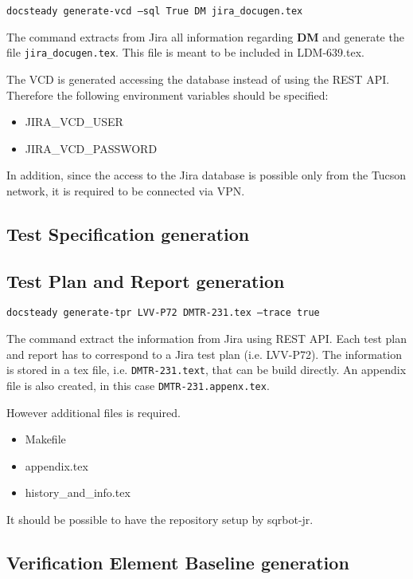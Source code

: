 \documentclass[DM]{lsstdoc}
\begin{document}
\texttt{docsteady generate-vcd --sql True DM jira\_docugen.tex}

The command extracts from Jira all information regarding \textbf{DM} and generate the file \texttt{jira\_docugen.tex}.
This file is meant to be included in LDM-639.tex.

The VCD is generated accessing the database instead of using the REST API. Therefore the following environment variables should be specified:

\begin{itemize}
\item JIRA\_VCD\_USER
\item JIRA\_VCD\_PASSWORD
\end{itemize}

In addition, since the access to the Jira database is possible only from the Tucson network, it is required to be connected via VPN.



\subsection{Test Specification generation}


\subsection{Test Plan and Report generation}

\texttt{docsteady generate-tpr LVV-P72 DMTR-231.tex --trace true}

The command extract the information from Jira using REST API.
Each test plan and report has to correspond to a Jira test plan (i.e. LVV-P72).
The information is stored in a tex file, i.e. \texttt{DMTR-231.text}, that can be build directly.
An appendix file is also created, in this case \texttt{DMTR-231.appenx.tex}.

However additional files is required.

\begin{itemize}
\item Makefile
\item appendix.tex
\item history\_and\_info.tex
\end{itemize}

It should be possible to have the repository setup by sqrbot-jr.


\subsection{Verification Element Baseline generation}
\end{document}
